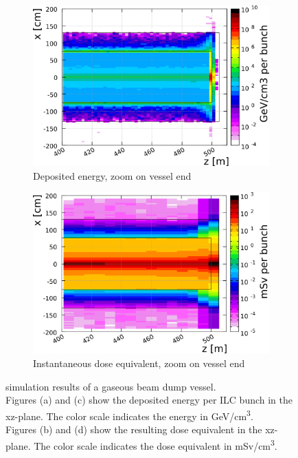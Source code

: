 \begin{figure}[h]
\begin{subfigure}[b]{0.49\textwidth}
    \includegraphics[width=\textwidth]{Figures/BeamDump/Gasdump/Energy_zoom.png}
   \caption{Deposited energy, zoom on vessel end}
   \end{subfigure}
   \hfill
   \begin{subfigure}[b]{0.49\textwidth}
   \centering
    \includegraphics[width=\textwidth]{Figures/BeamDump/Gasdump/Dose_eq_zoom.png}
   \caption{Instantaneous dose equivalent, zoom on vessel end}
   \end{subfigure}
   \caption[Deposited energy and dose equivalent in a gaseous beam dump]{
   \fluka simulation results of a gaseous beam dump vessel.
   \\Figures (a) and (c) show the deposited energy per ILC bunch in the xz-plane.
   The color scale indicates the energy in \si[detect-all]{\GeV}/\si{\centi\meter\cubed}.
   \\Figures (b) and (d) show the resulting dose equivalent in the xz-plane.
   The color scale indicates the dose equivalent in \si[detect-all]{\milli\sievert}/\si{\centi\meter\cubed}.}
   \label{fig:BeamDumps:GasDump}
\end{figure} 

